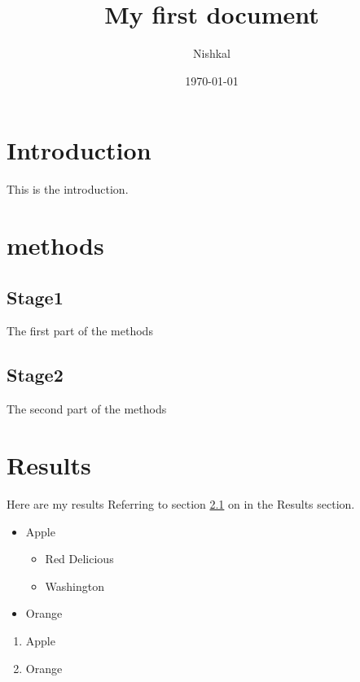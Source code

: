 \documentclass[a4paper, 12 pt]{article}
\begin{document}
	\title{My first document}
	\author{Nishkal}
	\date{\today}
	\maketitle
	\section{Introduction}
	This is the introduction.
	\section{methods}
	\subsection{Stage1}
	\label{sec1}
	The first part of the methods
	\subsection{Stage2}
	The second part of the methods
	\section{Results}
	Here are my results
	Referring to section \ref{sec1} on \pageref{sec1} in the Results section.
	\tableofcontents
	\newpage
	\begin{itemize}
		\item Apple
		\begin{itemize}
			\item Red Delicious
			\item Washington
		\end{itemize}
		\item Orange
	\end{itemize}
    \begin{enumerate}
	    \item Apple
	    \item Orange
    \end{enumerate}
\end{document}
